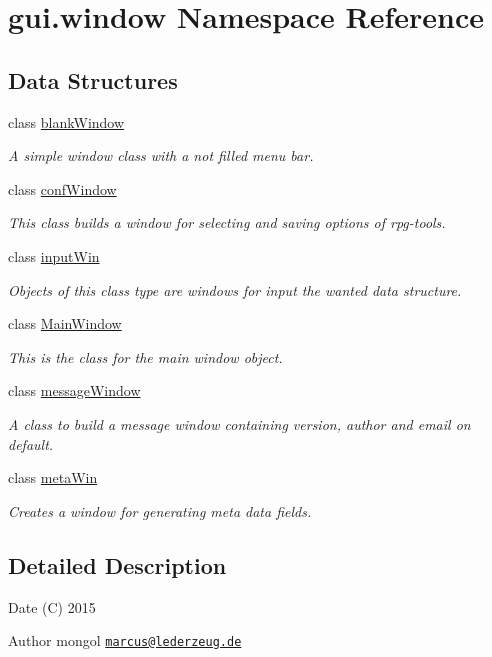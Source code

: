 \hypertarget{namespacegui_1_1window}{}\section{gui.\+window Namespace Reference}
\label{namespacegui_1_1window}
\subsection*{Data Structures}
\begin{DoxyCompactItemize}
\item 
class \hyperlink{classgui_1_1window_1_1blankWindow}{blank\+Window}
\begin{DoxyCompactList}\small\item\em A simple window class with a not filled menu bar. \end{DoxyCompactList}\item 
class \hyperlink{classgui_1_1window_1_1confWindow}{conf\+Window}
\begin{DoxyCompactList}\small\item\em This class builds a window for selecting and saving options of rpg-\/tools. \end{DoxyCompactList}\item 
class \hyperlink{classgui_1_1window_1_1inputWin}{input\+Win}
\begin{DoxyCompactList}\small\item\em Objects of this class type are windows for input the wanted data structure. \end{DoxyCompactList}\item 
class \hyperlink{classgui_1_1window_1_1MainWindow}{Main\+Window}
\begin{DoxyCompactList}\small\item\em This is the class for the main window object. \end{DoxyCompactList}\item 
class \hyperlink{classgui_1_1window_1_1messageWindow}{message\+Window}
\begin{DoxyCompactList}\small\item\em A class to build a message window containing version, author and email on default. \end{DoxyCompactList}\item 
class \hyperlink{classgui_1_1window_1_1metaWin}{meta\+Win}
\begin{DoxyCompactList}\small\item\em Creates a window for generating meta data fields. \end{DoxyCompactList}\end{DoxyCompactItemize}


\subsection{Detailed Description}
\begin{DoxyDate}{Date}
(C) 2015 
\end{DoxyDate}
\begin{DoxyAuthor}{Author}
mongol  \href{mailto:marcus@lederzeug.de}{\tt marcus@lederzeug.\+de} 
\end{DoxyAuthor}
